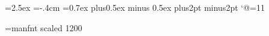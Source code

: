 \usepackage{amsmath}
\usepackage{amscd}
\usepackage{latexsym}
\usepackage{amssymb}
\usepackage{amsfonts}
\usepackage{graphicx}
\usepackage{graphics}
\usepackage{makeidx}
\makeindex
\topmargin=-1.5cm
\textwidth=15.5cm
\textheight=24cm
\headheight=2.5ex
\headsep=0.85cm
\evensidemargin=-.4cm
\parskip=0.7ex plus0.5ex minus 0.5ex
\baselineskip=17pt plus2pt minus2pt
\catcode`@=11

\font\manual=manfnt scaled 1200
\def\blackbox{\rule{1ex}{0.25ex}\rule{0.25ex}{1.25ex}}
\def\vuongden{\makebox[0.52em]{\raisebox{-.07ex}{\blackbox}}}
\def\vuong{$\Box$\llap{\vuongden}}
\def\fordbend{{\manual\char127}}
\def\ford@nger{\smallbreak\begingroup\clubpenalty=10000
\def\par{\endgraf\endgroup\smallbreak}\noindent\hang\hangafter=-2
\hbox to1pt{\hskip-1.2\hangindent\fordbend\hfill}}
\outer\def\fordanger{\ford@nger}
\def\enddanger{\endgraf\endgroup}
\newcommand{\remark}{\par\noindent{{\sc Chú ý }.}\rm\,~}
\gdef\contentsname{Mục lục}
\gdef\lmdname{Mở đầu}
\gdef\lmd{\chapter*{%
\lmdname\markboth{\protect\it{\lmdname}}
{\protect\it{\lmdname}}}%
\addcontentsline{toc}{chapter}{\lmdname}}

\gdef\lctname{Lời cảm ơn}
\gdef\lct{\chapter*{%
\lctname\markboth{\protect\it{\lctname}}
{\protect\it{\lctname}}}%
}

\gdef\lcdname{Lời cam đoan}
\gdef\lcd{\chapter*{%
\lcdname\markboth{\protect\it{\lcdname}}
{\protect\it{\lcdname}}}%
}

\gdef\lkname{Lời kết}
\gdef\lk{\chapter*{%
\lkname\markboth{\protect\it{\lkname}}
{\protect\it{\lkname}}}%
\addcontentsline{toc}{chapter}{\lkname}}


